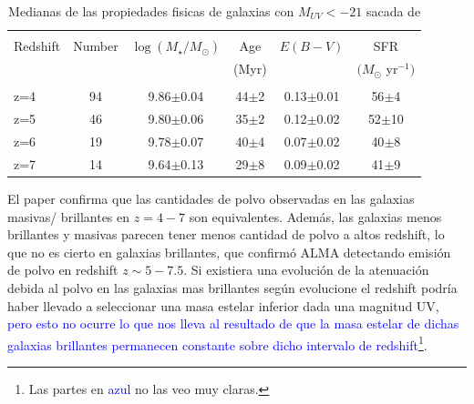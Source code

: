 \begin{table}[h]
\begin{center}
\begin{tabular}{lccccc}
\hline \hline\\
Redshift & Number & $\log(M_\star/M_\odot)$ & Age & $E(B-V)$ & SFR\\
	&	&	&	(Myr)	&	& $(M_\odot$ yr$^{-1})$\\
\hline\\
z=4 & 94 & 9.86$\pm$0.04 & 44$\pm$2 & 0.13$\pm$0.01 & 56$\pm$4\\
z=5 & 46 & 9.80$\pm$0.06 & 35$\pm$2 & 0.12$\pm$0.02 & 52$\pm$10\\
z=6 & 19 & 9.78$\pm$0.07 & 40$\pm$4 & 0.07$\pm$0.02 & 40$\pm$8\\
z=7 & 14 & 9.64$\pm$0.13 & 29$\pm$8 & 0.09$\pm$0.02 & 41$\pm$9\\
\hline
\end{tabular}
\caption{\label{tab:finkelstein1} Medianas de las propiedades fisicas de galaxias con $M_{UV}<-21$ sacada de \cite{finkelstein2015increasing}}
\end{center}
\end{table}

El paper \cite{finkelstein2015increasing} confirma que las cantidades de polvo observadas en las galaxias masivas/ brillantes en $z=4-7$ son equivalentes. Además, las galaxias menos brillantes y masivas parecen tener menos cantidad de polvo a altos redshift, lo que no es cierto en galaxias brillantes, que confirmó ALMA detectando emisión de polvo en redshift $z\sim 5-7.5$. Si existiera una evolución de la atenuación debida al polvo en las galaxias mas brillantes según evolucione el redshift  podría haber llevado a seleccionar una masa estelar inferior dada una magnitud UV, \textcolor{blue}{pero esto no ocurre lo que nos lleva al resultado de que la masa estelar de dichas galaxias brillantes permanecen constante sobre dicho intervalo de redshift}\footnote{Las partes en  \textcolor{blue}{azul} no las veo muy claras.}. \\

